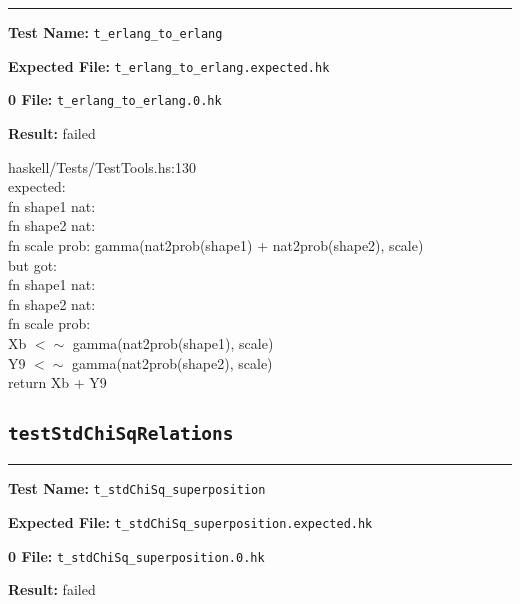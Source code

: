 \documentclass[11pt]{article}
\begin{document}
\hrule

\bigskip
\textbf{Test Name:} {\tt t\_erlang\_to\_erlang}

\textbf{Expected File:} {\tt t\_erlang\_to\_erlang.expected.hk}

\bigskip


\bigskip
\textbf{0 File:} {\tt t\_erlang\_to\_erlang.0.hk}

\bigskip


\bigskip
\textbf{Result:} failed

\bigskip
\noindent


\bigskip
\noindent
haskell/Tests/TestTools.hs:130\\expected:\\fn shape1 nat:\\fn shape2 nat:\\fn scale prob: gamma(nat2prob(shape1) + nat2prob(shape2), scale)\\but got:\\fn shape1 nat:\\fn shape2 nat:\\fn scale prob:\\Xb $<\sim$ gamma(nat2prob(shape1), scale)\\Y9 $<\sim$ gamma(nat2prob(shape2), scale)\\return Xb + Y9\\

\subsection{{\tt testStdChiSqRelations}}

\hrule

\bigskip
\textbf{Test Name:} {\tt t\_stdChiSq\_superposition}

\textbf{Expected File:} {\tt t\_stdChiSq\_superposition.expected.hk}

\bigskip


\bigskip
\textbf{0 File:} {\tt t\_stdChiSq\_superposition.0.hk}

\bigskip


\bigskip
\textbf{Result:} failed
\end{document}
